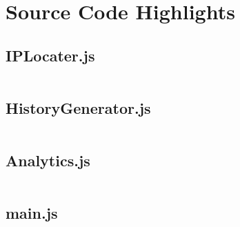 \documentclass[12pt,letterpaper,titlepage]{report}
\begin{document}
\appendix 
{
\setlength{\parskip}{1em}

\chapter{Source Code Highlights}

\section{IPLocater.js}

\inputminted[linenos,numbersep=5pt,frame=lines,framesep=2mm]{javascript}{IPLocator.js}

\section{HistoryGenerator.js}

\inputminted[linenos,numbersep=5pt,frame=lines,framesep=2mm]{javascript}{HistoryGenerator.js}

\section{Analytics.js}

\inputminted[linenos,numbersep=5pt,frame=lines,framesep=2mm]{javascript}{Analytics.js}

\section{main.js}

\inputminted[linenos,numbersep=5pt,frame=lines,framesep=2mm]{javascript}{main.js}



}
\end{document}
